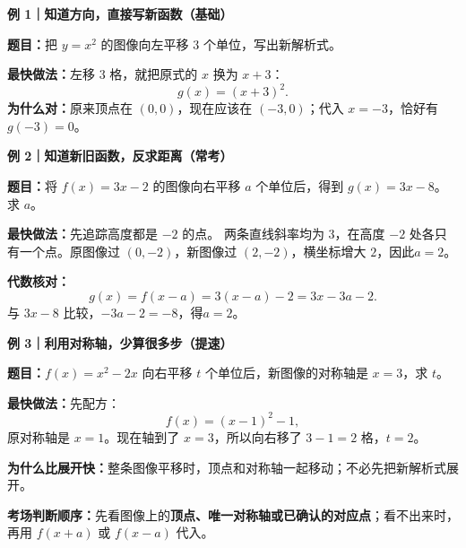 \begin{examplebox}
  \textbf{\textcolor{CExample}{例 1｜知道方向，直接写新函数（基础）}}

  \textbf{题目：}把 $y=x^2$ 的图像向左平移 $3$ 个单位，写出新解析式。

  \textbf{最快做法：}左移 $3$ 格，就把原式的 $x$ 换为 $x+3$：
  \[
    \boxed{g(x)=(x+3)^2}.
  \]
  \textbf{为什么对：}原来顶点在 $(0,0)$，现在应该在 $(-3,0)$；代入 $x=-3$，恰好有 $g(-3)=0$。
  \begin{center}
  
  \end{center}

  \medskip
  \textbf{\textcolor{CExample}{例 2｜知道新旧函数，反求距离（常考）}}

  \textbf{题目：}将 $f(x)=3x-2$ 的图像向右平移 $a$ 个单位后，得到 $g(x)=3x-8$。求 $a$。

  \textbf{最快做法：}先追踪高度都是 $-2$ 的点。
  两条直线斜率均为 $3$，在高度 $-2$ 处各只有一个点。原图像过 $(0,-2)$，新图像过 $(2,-2)$，横坐标增大 $2$，因此\textbf{$a=2$}。

  \textbf{代数核对：}
  \[
    g(x)=f(x-a)=3(x-a)-2=3x-3a-2.
  \]
  与 $3x-8$ 比较，$-3a-2=-8$，得\textbf{$\boxed{a=2}$}。
  \begin{center}
  
  \end{center}

  \medskip
  \textbf{\textcolor{CExample}{例 3｜利用对称轴，少算很多步（提速）}}

  \textbf{题目：}$f(x)=x^2-2x$ 向右平移 $t$ 个单位后，新图像的对称轴是 $x=3$，求 $t$。

  \textbf{最快做法：}先配方：
  \[
    f(x)=(x-1)^2-1,
  \]
  原对称轴是 $x=1$。现在轴到了 $x=3$，所以向右移了 $3-1=2$ 格，\textbf{$\boxed{t=2}$}。

  \textbf{为什么比展开快：}整条图像平移时，顶点和对称轴一起移动；不必先把新解析式展开。
  \begin{center}
  
  \end{center}

  \textbf{\textcolor{CExample}{考场判断顺序：}}先看图像上的\textbf{顶点、唯一对称轴或已确认的对应点}；看不出来时，再用 $f(x+a)$ 或 $f(x-a)$ 代入。
\end{examplebox}
